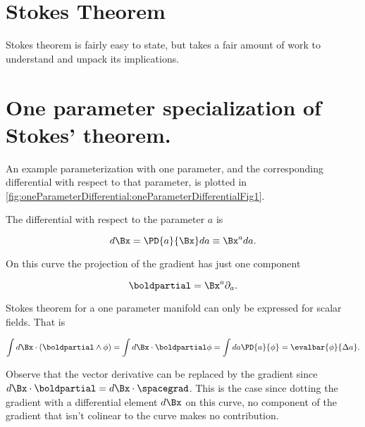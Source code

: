 %
%
\section{Stokes Theorem}

Stokes theorem is fairly easy to state, but takes a fair amount of work to understand and unpack its implications.



\section{One parameter specialization of Stokes' theorem.}

An example parameterization with one parameter, and the corresponding differential with respect to that parameter, is plotted in
\cref{fig:oneParameterDifferential:oneParameterDifferentialFig1}.


The differential with respect to the parameter \( a \) is

\begin{equation}\label{eqn:stokesTheoremCore:20}
d\Bx = \PD{a}{\Bx} da \equiv \Bx^a da.
\end{equation}

On this curve the projection of the gradient has just one component

\begin{equation}\label{eqn:stokesTheoremCore:40}
\boldpartial = \Bx^a \partial_a.
\end{equation}

Stokes theorem for a one parameter manifold can only be expressed for scalar fields.  That is

\begin{dmath}\label{eqn:stokesTheoremCore:60}
\int d\Bx \cdot (\boldpartial \wedge \phi)
=
\int d\Bx \cdot \boldpartial \phi
=
\int da \PD{a}{ \phi }
= \evalbar{\phi}{\Delta a}.
\end{dmath}

Observe that the vector derivative can be replaced by the gradient since \( d\Bx \cdot \boldpartial = d\Bx \cdot \spacegrad \).
This is the case since dotting the
gradient with a differential element \( d\Bx \) on this curve, no component of the gradient that isn't colinear to the curve makes no contribution.

